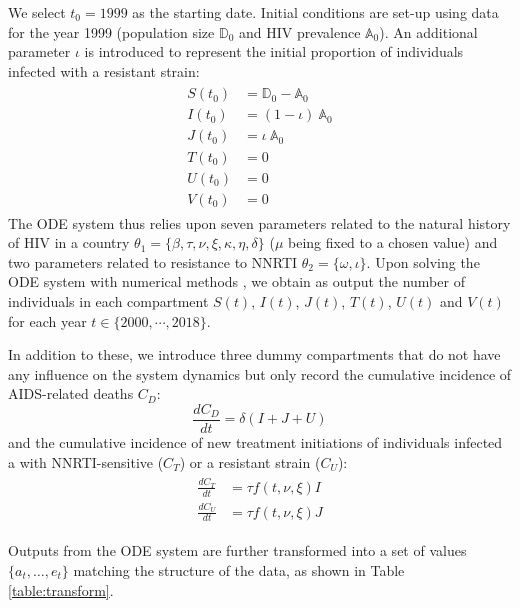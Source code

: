 \documentclass{article}
\begin{document}
	
	
	We select $t_0=1999$ as the starting date.
	Initial conditions are set-up using data for the year 1999 (population size $\mathds{D}_0$ and HIV prevalence $\mathds{A}_0$). 
	An additional parameter $\iota$ is introduced to represent the initial proportion of individuals infected with a resistant strain:
	\begin{align}
	\begin{split}
	S(t_0) &= \mathds{D}_0-\mathds{A}_0 \\
	I(t_0) &= (1-\iota) \ \mathds{A}_0 \\
	J(t_0) &= \iota \ \mathds{A}_0 \\
	T(t_0) &= 0 \\
	U(t_0) &= 0 \\
	V(t_0) &= 0
	\end{split}
	\end{align}
	The ODE system thus relies upon seven parameters related to the natural history of HIV in a country $\theta_1 = \{\beta, \tau, \nu, \xi, \kappa, \eta, \delta\}$ ($\mu$ being fixed to a chosen value) and two parameters related to resistance to NNRTI $\theta_2=\{\omega, \iota\}$.
	Upon solving the ODE system with numerical methods \cite{dormand1980family}, we obtain as output the number of individuals in each compartment $S(t)$, $I(t)$, $J(t)$, $T(t)$, $U(t)$ and $V(t)$ for each year $t \in \{2000,\cdots,2018\}$.
	
	In addition to these, we introduce three dummy compartments that do not have any influence on the system dynamics but only record the cumulative incidence of AIDS-related deaths $C_D$:
	\begin{equation}
	\frac{dC_D}{dt} = \delta (I + J + U)
	\end{equation}
	and the cumulative incidence of new treatment initiations of individuals infected a with NNRTI-sensitive ($C_T$) or a resistant strain ($C_U$):
	\begin{align}
	\begin{split}
	\frac{dC_T}{dt} &= \tau f(t,\nu,\xi)I \\
	\frac{dC_U}{dt} &= \tau f(t,\nu,\xi)J
	\end{split}
	\end{align}
	
	Outputs from the ODE system are further transformed into a set of values $\{a_t,\ldots,e_t\}$ matching the structure of the data, as shown in Table \ref{table:transform}. 
	
\end{document}
